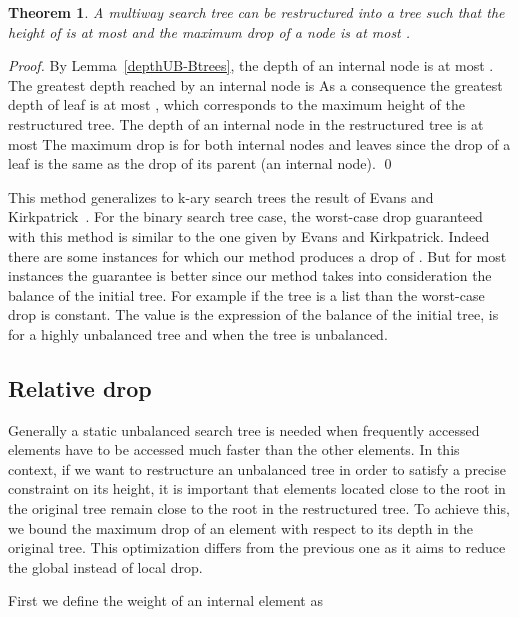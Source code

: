 \documentclass{llncs}\usepackage[english]{babel}
\newtheorem{thm}{Theorem}
\begin{document}
\begin{thm}
\label{dropdepthaddalpha}
A multiway search tree  can be restructured into a tree  such that the height of  is at most  and the maximum drop of a node is at most .
\end{thm}
\begin{proof}
By Lemma~\ref{depthUB-Btrees}, the depth of an internal node  is at most . The greatest depth reached by an internal  node is \vspace{-0.2cm}  As a consequence the greatest depth of leaf is at most , which corresponds to the maximum height of the restructured tree.
The depth of an internal node  in the restructured tree  is at most  The maximum drop is  for both internal nodes and leaves since the drop of a leaf is the same as the drop of its parent (an internal node). 
\qed \end{proof}

This method generalizes to k-ary search trees the result of Evans and Kirkpatrick~\cite{restructuringordered}. For the binary search tree case, the worst-case drop guaranteed with this method is similar to the one given by Evans and Kirkpatrick. Indeed there are some instances for which our method produces a drop of . But for most instances the guarantee is better since our method takes into consideration the balance of the initial tree. For example if the tree is a list than the worst-case drop is constant. The value  is the expression of the balance of the initial tree,  is  for a highly unbalanced tree and  when the tree is unbalanced. 



\subsection{Relative drop}
\label{depthpropdrop}
Generally a static unbalanced search tree is needed when frequently accessed elements have to be accessed much faster than the other elements. In this context, if we want to restructure an unbalanced tree in order to satisfy a precise constraint on its height, it is important that elements  located close to the root in the original tree remain close to the root in the restructured tree. To achieve this, we bound the maximum drop of an element with respect to its depth in the original tree. This optimization differs from the previous one as it aims to reduce the global instead of local drop. 

First we define the weight of an internal element  as
\end{document}

